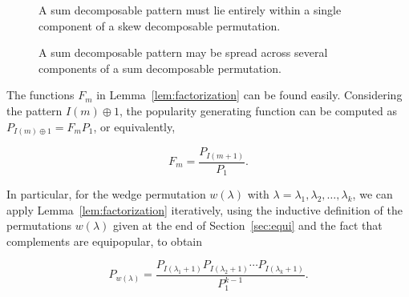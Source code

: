 \documentclass[10pt]{article}
\theoremstyle{definition}
\numberwithin{equation}{section}
\numberwithin{figure}{section}
\begin{document}
  \begin{figure}
			\begin{center}
			\end{center}
			\caption{A sum decomposable pattern must lie entirely within a single component of a skew decomposable permutation. }
			\label{fig:factorizationA}
		\endminipage\hfill
			\begin{center}
			\end{center}
			\caption{A sum decomposable pattern may be spread across several components of a sum decomposable permutation.}
			\label{fig:factorizationB}
		\endminipage
	\end{figure}


  The functions $F_{m}$ in Lemma~\ref{lem:factorization} can be found easily. Considering the pattern $I(m) \oplus 1$, the popularity generating function can be computed as $P_{I(m) \oplus 1} = F_m P_1$, or equivalently, 

\[
F_m = \frac{P_{I(m+1)}}{P_1}.
\]

In particular, for the wedge permutation $w(\lambda)$ with $\lambda = \lambda_1, \lambda_2, \dots, \lambda_k$, we can apply Lemma~\ref{lem:factorization} iteratively, using the inductive definition of the permutations $w(\lambda)$ given at the end of Section~\ref{sec:equi} and the fact that complements are equipopular, to obtain

\begin{equation}
\label{eq:wedge_popularity}
P_{w(\lambda)} = \frac{P_{I(\lambda_1 +1)} P_{I(\lambda_2 +1)}
    \cdots P_{I(\lambda_k +1)}}{P_1^{k-1}}. 
\end{equation}
  
\end{document}
